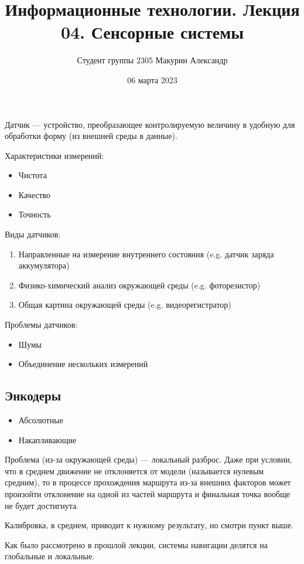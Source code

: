 \documentclass{article}
\title{Информационные технологии. Лекция 04. Сенсорные системы}
\author{Студент группы 2305 Макурин Александр}
\date{06 марта 2023}
\begin{document}
\maketitle
\begin{sloppypar}
    Датчик — устройство, преобразающее контролируемую величину в удобную для обработки форму (из внешней среды в данные).

    Характеристики измерений:
    \begin{itemize}
        \item Чистота
        \item Качество
        \item Точность
    \end{itemize}

    Виды датчиков:
    \begin{enumerate}
        \item Направленные на измерение внутреннего состояния (e.g. датчик заряда аккумулятора)
        \item Физико-химический анализ окружающей среды (e.g. фоторезистор)
        \item Общая картина окружающей среды (e.g. видеорегистратор)
    \end{enumerate}

    Проблемы датчиков:
    \begin{itemize}
        \item Шумы
        \item Объединение нескольких измерений
    \end{itemize}

    \subsection*{Энкодеры}
    \begin{itemize}
        \item Абсолютные
        \item Накапливающие
    \end{itemize}

    Проблема (из-за окружающей среды) — локальный разброс. Даже при условии, что в среднем движение не отклоняется от модели (называется нулевым средним), то в процессе прохождения маршрута из-за внешних факторов может произойти отклонение на одной из частей маршрута и финальная точка вообще не будет достигнута.

    Калибровка, в среднем, приводит к нужному результату, но смотри пункт выше.

    Как было рассмотрено в прошлой лекции, системы навигации делятся на глобальные и локальные.


\end{sloppypar}
\end{document}
